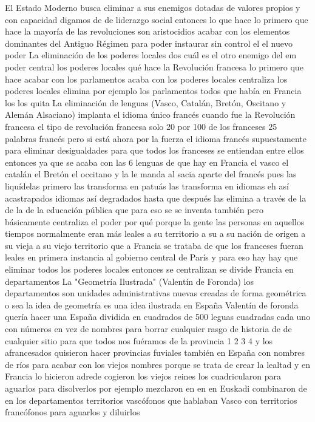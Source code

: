 El Estado Moderno busca eliminar a sus enemigos
dotadas de valores propios y con capacidad digamos de de liderazgo social entonces lo que hace
lo primero que hace la mayoría de las revoluciones son aristocidios acabar con los elementos dominantes del Antiguo Régimen
para poder instaurar sin control el el nuevo poder
La eliminación de los poderes locales
dos cuál es el otro enemigo del em poder central los poderes locales
qué hace la Revolución francesa lo primero que hace acabar con los
parlamentos acaba con los poderes locales centraliza los poderes locales
elimina por ejemplo los parlamentos todos que había en Francia los los quita
La eliminación de lenguas (Vasco, Catalán, Bretón, Oscitano y Alemán Alsaciano)
implanta el idioma único francés cuando fue la Revolución francesa el tipo de revolución francesa solo 20 por 100
de los franceses 25 palabras francés pero si está ahora por la fuerza el idioma francés
supuestamente para eliminar desigualdades para que todos los franceses se entiendan entre ellos entonces ya que se acaba con las 6 lenguas
de que hay en Francia el vasco el catalán el Bretón
el occitano y la le manda al sacia aparte del francés pues las liquídelas primero las transforma en patuás
las transforma en idiomas eh así acastrapados idiomas así degradados hasta que después las elimina
a través de la de la de la educación pública que para eso se se inventa también
pero básicamente centraliza el poder por qué porque la gente las personas en aquellos tiempos normalmente eran más leales a su territorio
a su a su nación de origen a su vieja a su viejo territorio que a Francia se trataba de que los franceses fueran leales
en primera instancia al gobierno central de París y para eso hay
hay que eliminar todos los poderes locales entonces se centralizan se divide Francia en departamentos
La "Geometría Ilustrada" (Valentín de Foronda)
los departamentos son unidades administrativas nuevas creadas de forma geométrica
o sea la idea de geometría es una idea ilustrada en España Valentín de foronda quería hacer una España dividida en cuadrados
de 500 leguas cuadradas cada uno con números en vez de nombres para borrar cualquier rasgo de historia
de de cualquier sitio para que todos nos fuéramos de la provincia 1 2 3 4 y los afrancesados quisieron hacer provincias fuviales
también en España con nombres de ríos para acabar con los viejos nombres porque se trata de crear la lealtad y en Francia lo hicieron adrede
cogieron los viejos reines los cuadricularon para aguarlos para disolverlos por ejemplo mezclaron en en en Euskadi combinaron
de en los departamentos territorios vascófonos que hablaban Vasco con territorios francófonos para aguarlos y diluirlos
